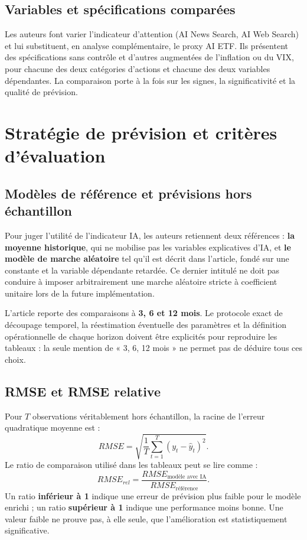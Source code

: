 \documentclass[11pt,a4paper]{article}
\begin{document}
\subsection{Variables et spécifications comparées}
Les auteurs font varier l'indicateur d'attention (AI News Search, AI Web Search) et lui substituent, en analyse complémentaire, le proxy AI ETF. Ils présentent des spécifications sans contrôle et d'autres augmentées de l'inflation ou du VIX, pour chacune des deux catégories d'actions et chacune des deux variables dépendantes. La comparaison porte à la fois sur les signes, la significativité et la qualité de prévision.

\section{Stratégie de prévision et critères d'évaluation}
\subsection{Modèles de référence et prévisions hors échantillon}
Pour juger l'utilité de l'indicateur IA, les auteurs retiennent deux références : \textbf{la moyenne historique}, qui ne mobilise pas les variables explicatives d'IA, et \textbf{le modèle de marche aléatoire} tel qu'il est décrit dans l'article, fondé sur une constante et la variable dépendante retardée. Ce dernier intitulé ne doit pas conduire à imposer arbitrairement une marche aléatoire stricte à coefficient unitaire lors de la future implémentation.

L'article reporte des comparaisons à \textbf{3, 6 et 12 mois}. Le protocole exact de découpage temporel, la réestimation éventuelle des paramètres et la définition opérationnelle de chaque horizon doivent être explicités pour reproduire les tableaux : la seule mention de « 3, 6, 12 mois » ne permet pas de déduire tous ces choix.

\subsection{RMSE et RMSE relative}
Pour $T$ observations véritablement hors échantillon, la racine de l'erreur quadratique moyenne est :
\begin{equation}
\label{eq:rmse}
RMSE = \sqrt{\frac{1}{T}\sum_{t=1}^{T}(y_t-\widehat y_t)^2}.
\end{equation}
Le ratio de comparaison utilisé dans les tableaux peut se lire comme :
\begin{equation}
\label{eq:rrmse}
RMSE_{rel} = \frac{RMSE_{\text{modèle avec IA}}}{RMSE_{\text{référence}}}.
\end{equation}
Un ratio \textbf{inférieur à 1} indique une erreur de prévision plus faible pour le modèle enrichi ; un ratio \textbf{supérieur à 1} indique une performance moins bonne. Une valeur faible ne prouve pas, à elle seule, que l'amélioration est statistiquement significative.
\end{document}
